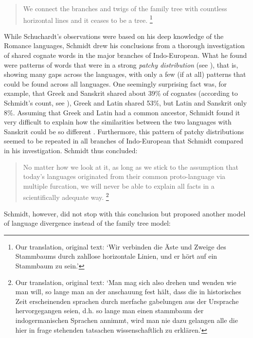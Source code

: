 \documentclass[svgnames,12pt]{scrartcl}
\begin{document}
{\begin{quote}
\small We connect the branches and twigs of the family tree with countless horizontal lines and it ceases
to be a tree. \citep[9]{Schuchardt1870}\footnote{Our translation, original text: `Wir verbinden die
Äste und Zweige des Stammbaums durch zahllose horizontale Linien, und er hört auf ein Stammbaum zu
sein.'} 
\end{quote}

While Schuchardt's observations were based on his deep knowledge of the Romance languages, Schmidt
drew his conclusions from a thorough investigation of shared cognate words in the major branches
of Indo-European. What he found were patterns of words that were in a strong \emph{patchy
distribution} (see \citealt{List2014a}), that is, showing many gaps across the languages, with only
a few (if at all) patterns that could be found across all languages. One seemingly surprising fact
was, for example, that Greek and Sanskrit shared about 39\% of cognates (according to Schmidt's
count, see \citealt{Geisler2013}), Greek and Latin shared 53\%, but Latin and Sanskrit only 8\%.
Assuming that Greek and Latin had a common ancestor, Schmidt found it very difficult to explain how
the similarities between the two languages with Sanskrit could be so different
\citep[24]{Schmidt1872}. Furthermore, this pattern of patchy distributions seemed to be repeated in
all branches of Indo-European that Schmidt compared in his investigation. Schmidt thus concluded: 

\begin{quote}
     \small No matter how we look at it, as long as we stick to the assumption that today's languages
     originated from their common proto-language via multiple furcation, we will never be able to
     explain all facts in a scientifically adequate way. \citep[17]{Schmidt1872}\footnote{Our
     translation, original text: `Man mag sich also drehen und wenden wie man will, so lange man an
     der anschauung fest hält, dass die in historisches Zeit erscheinenden sprachen durch merfache
     gabelungen aus der Ursprache hervorgegangen seien, d.h. so lange man einen stammbaum der
     indogermanischen Sprachen annimmt, wird man nie dazu gelangen alle die hier in frage stehenden
     tatsachen wissenschaftlich zu erklären.'} 
\end{quote}

Schmidt, however, did not stop with this conclusion but proposed another model of language
divergence instead of the family tree model:

}
\end{document}

